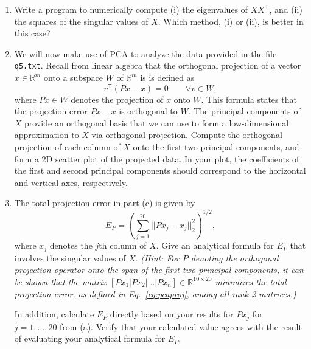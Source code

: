 \documentclass[11pt]{article}
\newcommand{\R}{\mathbb{R}}
\newcommand{\Trans}{\mathsf{T}}
\begin{document}
\begin{enumerate}
\begin{enumerate}
\begin{equation}
\begin{array}{ccccc}
	    1 & 0 & 0 & 10^{-8} & 0 \\
	    1 & 0 & 0 & 0 & 10^{-8}
	  \end{array}
	  \right].
	\end{equation}
	What are the exact eigenvalues of $XX^\Trans$? You can either find
	these by hand, or you can make use of a symbolic computing environment
	like Mathematica or Maple.
      \item Write a program to numerically compute (i) the eigenvalues of
	$XX^\Trans$, and (ii) the squares of the singular values of $X$.
	Which method, (i) or (ii), is better in this case?
      \item We will now make use of PCA to analyze the data provided in the file \texttt{q5.txt}. Recall from linear algebra that the orthogonal projection of a vector $x \in \R^m$ onto a subspace $W$ of $\R^m$ is is defined as
	\begin{equation}
	  v^\Trans(Px-x) = 0 \qquad \forall v \in W,
	\end{equation}
	where $Px \in W$ denotes the projection of $x$ onto $W$. This formula
	states that the projection error $Px - x$ is orthogonal to $W$. The
	principal components of $X$ provide an orthogonal basis that we can use
	to form a low-dimensional approximation to $X$ via orthogonal
	projection. Compute the orthogonal projection of each column of $X$
	onto the first two principal components, and form a 2D scatter plot of
	the projected data. In your plot, the coefficients of the first and
	second principal components should correspond to the horizontal and
	vertical axes, respectively.
      \item The total projection error in part (c) is given by
	\begin{equation}
	  E_P = \left( \sum_{j=1}^{20} ||Px_j - x_j||_2^2 \right)^{1/2},
	  \label{eq:pcaproj}
	\end{equation}
	where $x_j$ denotes the $j$th column of $X$. Give an analytical formula
	for $E_P$ that involves the singular values of $X$. {\it (Hint: For $P$
	denoting the orthogonal projection operator onto the span of the first
	two principal components, it can be shown that the matrix $[Px_1 | Px_2
	| \dots | Px_n] \in \R^{10\times20}$ minimizes the total projection
	error, as defined in Eq.~\ref{eq:pcaproj}, among all rank 2 matrices.)}

	In addition, calculate $E_P$ directly based on your results for $P x_j$
	for $j = 1, \ldots , 20$ from (a). Verify that your calculated value
	agrees with the result of evaluating your analytical formula for $E_P$.
    \end{enumerate}
\end{enumerate}
\end{document}
